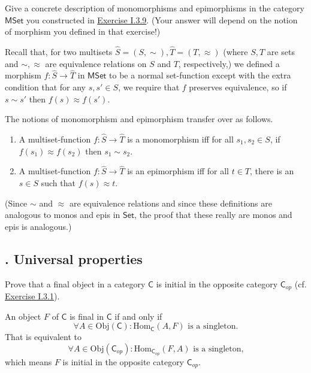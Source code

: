 \documentclass[12pt,letterpaper,boxed]{hmcpset}
\newcommand{\Obj}{\mathrm{Obj}}
\newcommand{\Hom}{\mathrm{Hom}}
\newcommand{\Set}{\mathsf{Set}}
\begin{document}
\begin{problem}[4.5]
	Give a concrete description of monomorphisms and epimorphisms in the category
	$\mathsf{MSet}$ you constructed in \hyperlink{Exercise I.3.9}{Exercise I.3.9}. (Your answer will depend on the notion
	of morphism you defined in that exercise!)
\end{problem}
\begin{solution}
	Recall that, for two multisets $\hat{S}=(S,\sim),\hat{T}=(T,\approx)$ (where
	$S,T$ are sets and $\sim,\approx$ are equivalence relations on $S$ and $T$,
	respectively,) we defined a morphism $f:\hat{S}\to\hat{T}$ in $\mathsf{MSet}$ to be a
	normal set-function except with the extra condition that for any $s,s'\in S$, we
	require that $f$ preserves equivalence, so if $s\sim s'$ then $f(s)\approx
	f(s')$.
	
	The notions of monomorphism and epimorphism transfer over as follows.
	
	\begin{enumerate}
		\item A multiset-function $f:\hat{S}\to\hat{T}$ is a monomorphism iff for all
		$s_1,s_2\in S$, if $f(s_1)\approx f(s_2)$ then $s_1\sim s_2$.
		\item A multiset-function $f:\hat{S}\to\hat{T}$ is an epimorphism iff for all
		$t\in T$, there is an $s\in S$ such that $f(s)\approx t$.
	\end{enumerate}
	
	(Since $\sim$ and $\approx$ are equivalence relations and since these
	definitions are analogous to monos and epis in $\Set$, the proof that these
	really are monos and epis is analogous.)
\end{solution}



\subsection{. Universal properties}
\begin{problem}[5.1]
	Prove that a final object in a category $\mathsf{C}$ is initial in the opposite category $\mathsf{C}_{op}$	(cf. \hyperlink{Exercise I.3.1}{Exercise I.3.1}).
\end{problem}
\begin{solution}
	An object $F$ of $\mathsf{C}$ is final in $\mathsf{C}$ if and only if
	\[
	\forall A \in \Obj(\mathsf{C}) : \Hom_\mathsf{C}(A,F) \text{ is a singleton.}
	\]
	That is equivalent to
	\[
	\forall A \in \Obj(\mathsf{C}_{op}) : \Hom_{\mathsf{C}_{op}}(F,A) \text{ is a singleton,}
	\]
	which means $F$ is initial in the opposite category $\mathsf{C}_{op}$.	
\end{solution}
\end{document}
